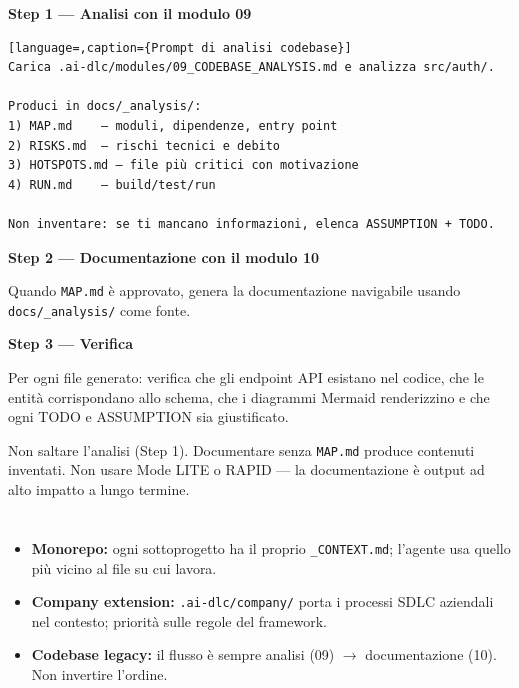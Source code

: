 \textbf{Step 1 --- Analisi con il modulo 09}

\begin{lstlisting}[language=,caption={Prompt di analisi codebase}]
Carica .ai-dlc/modules/09_CODEBASE_ANALYSIS.md e analizza src/auth/.

Produci in docs/_analysis/:
1) MAP.md    — moduli, dipendenze, entry point
2) RISKS.md  — rischi tecnici e debito
3) HOTSPOTS.md — file più critici con motivazione
4) RUN.md    — build/test/run

Non inventare: se ti mancano informazioni, elenca ASSUMPTION + TODO.
\end{lstlisting}

\textbf{Step 2 --- Documentazione con il modulo 10}

Quando \texttt{MAP.md} è approvato, genera la documentazione navigabile usando \texttt{docs/\_analysis/} come fonte.

\textbf{Step 3 --- Verifica}

Per ogni file generato: verifica che gli endpoint API esistano nel codice, che le entità corrispondano allo schema, che i diagrammi Mermaid renderizzino e che ogni TODO e ASSUMPTION sia giustificato.

\begin{warnbox}
Non saltare l'analisi (Step 1). Documentare senza \texttt{MAP.md} produce contenuti inventati. Non usare Mode LITE o RAPID --- la documentazione è output ad alto impatto a lungo termine.
\end{warnbox}

\section*{\LabelSummary}

\begin{itemize}
  \item \textbf{Monorepo:} ogni sottoprogetto ha il proprio \texttt{\_CONTEXT.md}; l'agente usa quello più vicino al file su cui lavora.
  \item \textbf{Company extension:} \texttt{.ai-dlc/company/} porta i processi SDLC aziendali nel contesto; priorità sulle regole del framework.
  \item \textbf{Codebase legacy:} il flusso è sempre analisi (09) $\to$ documentazione (10). Non invertire l'ordine.
\end{itemize}
